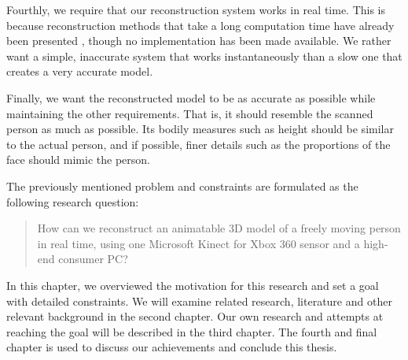 Fourthly, we require that our reconstruction system works in real time. This is because reconstruction methods that take a long computation time have already been presented \citep{weiss2011home}, though no implementation has been made available. We rather want a simple, inaccurate system that works instantaneously than a slow one that creates a very accurate model.

Finally, we want the reconstructed model to be as accurate as possible while maintaining the other requirements. That is, it should resemble the scanned person as much as possible. Its bodily measures such as height should be similar to the actual person, and if possible, finer details such as the proportions of the face should mimic the person.

The previously mentioned problem and constraints are formulated as the following research question:

\begin{quote}
How can we reconstruct an animatable 3D model of a freely moving person in real time, using one Microsoft Kinect for Xbox 360 sensor and a high-end consumer PC?
\end{quote}

\newtopic

In this chapter, we overviewed the motivation for this research and set a goal with detailed constraints. We will examine related research, literature and other relevant background in the second chapter. Our own research and attempts at reaching the goal will be described in the third chapter. The fourth and final chapter is used to discuss our achievements and conclude this thesis.
